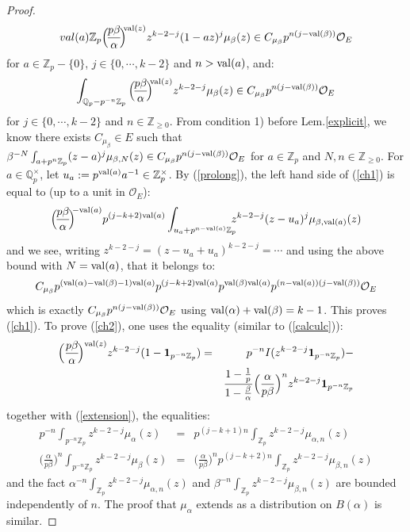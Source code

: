 \documentclass[11pt]{amsart}
\def\Z{{\mathbb Z}_p}
\def\Q{{\mathbb Q}_p}
\def\O{{\mathcal O}_E}
\begin{document}
\begin{proof}
\begin{eqnarray}
{{{      val}(a)}\Z}\Big(\!\frac{p\beta}{\alpha}\!\Big)^{\!\!{\rm val}
(z)}z^{k-2-j}(1-az)^j\mu_{\beta}(z)\in C_{\mu_{\beta}}
p^{n(j-{\rm val}(\beta))}\O 
\end{eqnarray} 
for $a\in \Z-\{0\}$, $j\in\{0,\cdots,k-2\}$ and $n>{\rm val}(a)$, and: 
\begin{eqnarray}\label{ch2} 
\int_{\Q-p^{-n}\Z}\Big(\!\frac{p\beta}{\alpha}\!\Big)^{\!\!{\rm
    val}(z)}z^{k-2-j}\mu_{\beta}(z)\in C_{\mu_{\beta}}p^{n(j-{\rm
    val}(\beta))}\O  
\end{eqnarray} 
for $j\in\{0,\cdots,k-2\}$ and $n\in {\mathbb Z}_{\geq 0}$. From
condition 1) before Lem.\ref{explicit}, we know there exists
$C_{\mu_{\beta}}\in E$ such that
$\beta^{-N}\int_{a+p^n\Z}(z-a)^j\mu_{\beta,N}(z)\in
C_{\mu_{\beta}}p^{n(j-{\rm val}(\beta))}\O$ for $a\in \Z$ and $N,n\in
{\mathbb Z}_{\geq 0}$. For $a\in \Q^{\times}$, let $u_a:=p^{{\rm
    val}(a)}a^{-1}\in \Z^{\times}$. By (\ref{prolong}), the left hand
side of (\ref{ch1}) is equal to (up to a unit in $\O$):  
$$\Big(\!\frac{p\beta}{\alpha}\!\Big)^{\!\!-{\rm
    val}(a)}p^{(j-k+2){\rm val}(a)}\int_{u_a+p^{n-{\rm
      val}(a)}\Z}\!\!\!\!z^{k-2-j}(z-u_a)^j\mu_{\beta,{\rm
    val}(a)}(z)$$  
and we see, writing $z^{k-2-j}=(z-u_a+u_a)^{k-2-j}=\cdots$ and using
    the above bound with $N={\rm val}(a)$, that it belongs to:  
$$C_{\mu_{\beta}}p^{({\rm val}(\alpha)-{\rm val}(\beta)-1){\rm
	val}(a)}p^{(j-k+2){\rm val}(a)}p^{{\rm val}(\beta){\rm
	val}(a)}p^{(n-{\rm val}(a))(j-{\rm val}(\beta))}\O$$  
which is exactly $C_{\mu_{\beta}}p^{n(j-{\rm val}(\beta))}\O$ using
${\rm val}(\alpha)+{\rm val}(\beta)=k-1$. This proves (\ref{ch1}). To
prove (\ref{ch2}), one uses the equality (similar to (\ref{calculc})):  
\begin{eqnarray*} 
\Big(\frac{p\beta}{\alpha}\!\Big)^{{\rm val}(z)}z^{k-2-j}(1-{\mathbf
  1}_{p^{-n}\Z})&=&p^{-n}I(z^{k-2-j}{\mathbf 1}_{p^{-n}\Z})-\\  
&&\frac{1-\frac{1}{p}}{1-\frac{\beta}{\alpha}}\Big(\frac{\alpha}{p\beta}\Big)^nz^{k-2-j}{\mathbf
  1}_{p^{-n}\Z}  
\end{eqnarray*} 
together with (\ref{extension}), the equalities:  
\begin{eqnarray*} 
p^{-n}\int_{p^{-n}\Z}z^{k-2-j}\mu_{\alpha}(z)&=&p^{(j-k+1)n}
\int_{\Z}z^{k-2-j}\mu_{\alpha,n}(z)\\    
\Big(\!\frac{\alpha}{p\beta}\!\Big)^n\int_{p^{-n}\Z}z^{k-2-j}
\mu_{\beta}(z)&=&\Big(\!\frac{\alpha}{p\beta}\!\Big)^np^{(j-k+2)n}
\int_{\Z}z^{k-2-j}\mu_{\beta,n}(z) 
\end{eqnarray*} 
and the fact $\alpha^{-n}\int_{\Z}z^{k-2-j}\mu_{\alpha,n}(z)$ and
$\beta^{-n}\int_{\Z}z^{k-2-j}\mu_{\beta,n}(z)$ are bounded
independently of $n$. The proof that $\mu_{\alpha}$ extends as a
distribution on $B(\alpha)$ is similar.  
\end{proof} 
 
\end{document}
